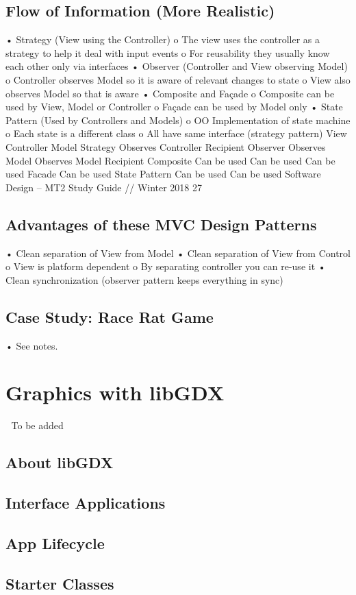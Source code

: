 \documentclass[11pt]{article}
\begin{document}
{{\subsection{Flow of Information (More Realistic)}
• Strategy (View using the Controller)
o The view uses the controller as a strategy to help it deal with input events
o For reusability they usually know each other only via interfaces
• Observer (Controller and View observing Model)
o Controller observes Model so it is aware of relevant changes to state
o View also observes Model so that is aware
• Composite and Façade
o Composite can be used by View, Model or Controller
o Façade can be used by Model only
• State Pattern (Used by Controllers and Models)
o OO Implementation of state machine
o Each state is a different class
o All have same interface (strategy pattern)
View Controller Model
Strategy Observes Controller Recipient
Observer Observes Model Observes Model Recipient
Composite Can be used Can be used Can be used
Facade Can be used
State Pattern Can be used Can be used
Software Design – MT2 Study Guide // Winter 2018 27
\subsection{Advantages of these MVC Design Patterns}
• Clean separation of View from Model
• Clean separation of View from Control
o View is platform dependent
o By separating controller you can re-use it
• Clean synchronization (observer pattern keeps everything in sync)
\subsection{Case Study: Race Rat Game}
• See notes.
\section{Graphics with libGDX}
 To be added
\subsection{About libGDX}
\subsection{Interface Applications}
\subsection{App Lifecycle}
\subsection{Starter Classes}
}}
\end{document}
